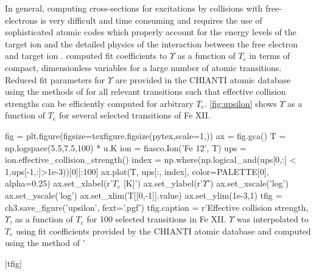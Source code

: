 In general, computing cross-sections for excitations by collisions with free-electrons is very difficult and time consuming and requires the use of sophisticated atomic codes which properly account for the energy levels of the target ion and the detailed physics of the interaction between the free electron and target ion \citep[][section 4.2.3]{phillips_ultraviolet_2008,bautista_theoretical_2000}. \citet{burgess_analysis_1992} computed fit coefficients to $\Upsilon$ as a function of $T_e$ in terms of compact, dimensionless variables for a large number of atomic transitions. Reduced fit parameters for $\Upsilon$ are provided in the CHIANTI atomic database using the methods of \citet{burgess_analysis_1992} for all relevant transitions such that effective collision strengths can be efficiently computed for arbitrary $T_e$. \autoref{fig:upsilon} shows $\Upsilon$ as a function of $T_e$ for several selected transitions of Fe XII.

\begin{pycode}[chapter3]
fig = plt.figure(figsize=texfigure.figsize(pytex,scale=1,))
ax = fig.gca()
T = np.logspace(5.5,7.5,100) * u.K
ion = fiasco.Ion('Fe 12', T)
ups = ion.effective_collision_strength()
index = np.where(np.logical_and(ups[0,:] < 1,ups[-1,:]>1e-3))[0][:100]
ax.plot(T, ups[:, index], color=PALETTE[0], alpha=0.25)
ax.set_xlabel(r'$T_e$ [K]')
ax.set_ylabel(r'$\Upsilon$')
ax.set_xscale('log')
ax.set_yscale('log')
ax.set_xlim(T[[0,-1]].value)
ax.set_ylim(1e-3,1)
tfig = ch3.save_figure('upsilon', fext='.pgf')
tfig.caption = r'Effective collision strength, $\Upsilon$, as a function of $T_e$ for 100 selected transitions in Fe XII. $\Upsilon$ was interpolated to $T_e$ using fit coefficients provided by the CHIANTI atomic database and computed using the method of \citet{burgess_analysis_1992}'
\end{pycode}
\py[chapter3]|tfig|

